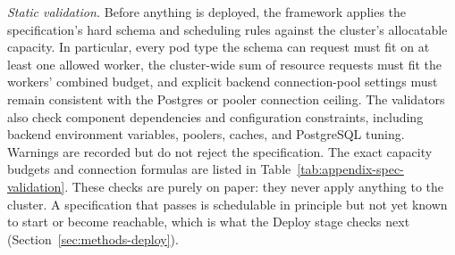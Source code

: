 \smallskip
\emph{Static validation.}
Before anything is deployed, the framework applies the specification's hard
schema and scheduling rules against the cluster's allocatable capacity. In
particular, every pod type the schema can request must fit on at least one
allowed worker, the cluster-wide sum of resource requests must fit the
workers' combined budget, and explicit backend connection-pool settings must
remain consistent with the Postgres or pooler connection ceiling. The
validators also check component dependencies and configuration constraints,
including backend environment variables, poolers, caches, and PostgreSQL
tuning. Warnings are recorded but do not reject the specification. The exact
capacity budgets and connection formulas are listed in
Table~\ref{tab:appendix-spec-validation}. These checks are purely on paper:
they never apply anything to the cluster. A specification that passes is
schedulable in principle but not yet known to start or become reachable,
which is what the Deploy stage checks next
(Section~\ref{sec:methods-deploy}).

